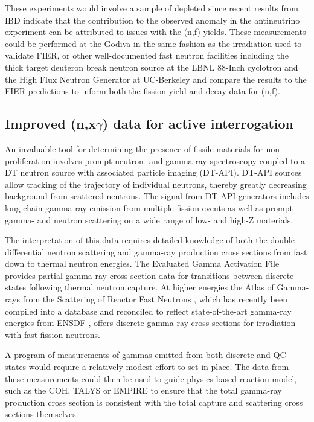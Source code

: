 \documentclass[letterpaper]{ar-1col}
\begin{document}
These experiments would involve a sample of depleted  since recent results from IBD indicate that the contribution to the observed anomaly in the antineutrino experiment can be attributed to issues with the (n,f) yields.
These measurements could be performed at the Godiva in the same fashion as the  irradiation used to validate FIER, or other well-documented fast neutron facilities including the thick target deuteron break neutron source at the LBNL 88-Inch cyclotron \cite{Harrig2018} and the High Flux Neutron Generator at UC-Berkeley \cite{ayllon2018design} and compare the results to the FIER predictions to inform both the fission yield and decay data for (n,f).


\subsection{Improved (n,x\texorpdfstring{$\gamma$}{ gamma}) data for active interrogation}

An invaluable tool for determining the presence of fissile materials for non-proliferation involves prompt neutron- and gamma-ray spectroscopy coupled to a DT neutron source with associated particle imaging (DT-API).
  DT-API sources allow tracking of the trajectory of individual neutrons, thereby greatly decreasing background from scattered neutrons.
 The signal from DT-API generators includes long-chain gamma-ray emission from multiple fission events \cite{Pra12,Nak10} as well as prompt gamma- and neutron scattering on a wide range of low- and high-Z materials.
  

The interpretation of this data requires detailed knowledge of both the double-differential neutron scattering and gamma-ray production cross sections from fast down to thermal neutron energies.
 The Evaluated Gamma Activation File \cite{Fir15} provides partial gamma-ray cross section data for transitions between discrete states following thermal neutron capture.
 At higher energies the Atlas of Gamma-rays from the Scattering of Reactor Fast Neutrons \cite{Dem78}, which has recently been compiled into a database and reconciled to reflect state-of-the-art gamma-ray energies from ENSDF \cite{Hur18}, offers discrete gamma-ray cross sections for irradiation with fast fission neutrons.
 

A program of measurements of gammas emitted from both discrete and QC states would require a relatively modest effort to set in place.
 The data from these measurements could then be used to guide physics-based reaction model, such as the COH, TALYS or EMPIRE to ensure that the total gamma-ray production cross section is consistent with the total capture and scattering cross sections themselves.
\end{document}
